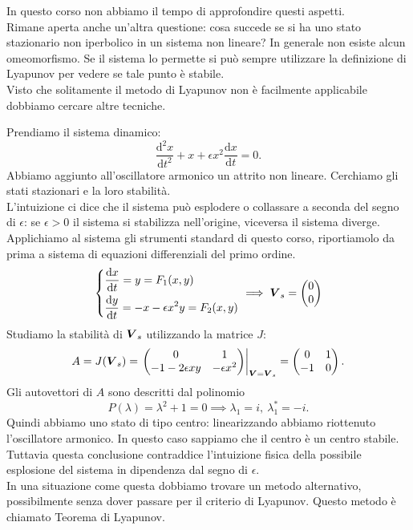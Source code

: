 In questo corso non abbiamo il tempo di approfondire questi aspetti.\\
Rimane aperta anche un'altra questione: cosa succede se si ha uno stato stazionario non iperbolico in un sistema non lineare? In generale non esiste alcun omeomorfismo. Se il sistema lo permette si può sempre utilizzare la definizione di Lyapunov per vedere se tale punto è stabile.\\
Visto che solitamente il metodo di Lyapunov non è facilmente applicabile dobbiamo cercare altre tecniche.
\begin{exmp}
    Prendiamo il sistema dinamico:
    \[
	\frac{\text{d}^2 x}{\text{d} t^2} + x + \epsilon  x^2\frac{\text{d} x}{\text{d} t} = 0
    .\] 
    Abbiamo aggiunto all'oscillatore armonico un attrito non lineare. Cerchiamo gli stati stazionari e la loro stabilità.\\
    L'intuizione ci dice che il sistema può esplodere o collassare a seconda del segno di $\epsilon$: se $\epsilon>0$ il sistema si stabilizza nell'origine, viceversa il sistema diverge.\\
    Applichiamo al sistema gli strumenti standard di questo corso, riportiamolo da prima a sistema di equazioni differenziali del primo ordine.
    \[
    \begin{dcases}
	\frac{\text{d} x}{\text{d} t} = y = F_1(x, y) \\
	\frac{\text{d} y}{\text{d} t} = - x - \epsilon x^2 y = F_2(x, y) 
    \end{dcases}
    \implies  \boldsymbol{V}_s = \begin{pmatrix} 0 \\ 0 \end{pmatrix}
    \]
    Studiamo la stabilità di $\boldsymbol{V}_s$ utilizzando la matrice $J$:
    \[
	A = J(\boldsymbol{V}_s) = 
	\left.
        \begin{pmatrix}
	0 & 1 \\
	-1 - 2\epsilon xy & -\epsilon x^2 \\
        \end{pmatrix}
	\right|_{\boldsymbol{V}= \boldsymbol{V}_s}
	= 
        \begin{pmatrix}
	0 & 1 \\
	-1 & 0 \\
        \end{pmatrix}
        .\] 
	Gli autovettori di $A$ sono descritti dal polinomio
	\[
	    P(\lambda) = \lambda^2 + 1 = 0 \implies  \lambda_1 = i, \ \lambda_1^* = -i
	.\] 
	Quindi abbiamo uno stato di tipo centro: linearizzando abbiamo riottenuto l'oscillatore armonico. In questo caso sappiamo che il centro è un centro stabile.\\
	Tuttavia questa conclusione contraddice l'intuizione fisica della possibile esplosione del sistema in dipendenza dal segno di $\epsilon$.\\
	In una situazione come questa dobbiamo trovare un metodo alternativo, possibilmente senza dover passare per il criterio di Lyapunov. Questo metodo è chiamato Teorema di Lyapunov.
\end{exmp}
\noindent
